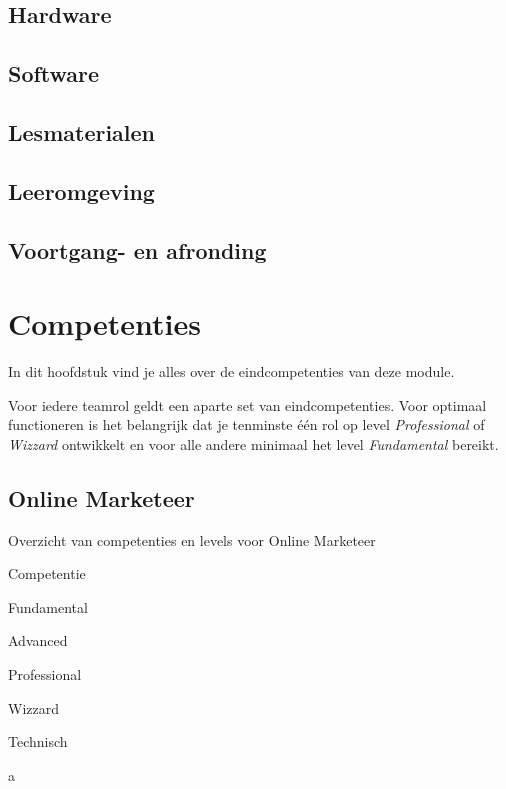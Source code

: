 \documentclass[]{book}
\begin{document}
\section{Hardware}\label{hardware}

\section{Software}\label{software}

\section{Lesmaterialen}\label{lesmaterialen}

\section{Leeromgeving}\label{leeromgeving}

\section{Voortgang- en afronding}\label{voortgang--en-afronding}

\chapter{Competenties}\label{competenties}

In dit hoofdstuk vind je alles over de eindcompetenties van deze module.

Voor iedere teamrol geldt een aparte set van eindcompetenties. Voor
optimaal functioneren is het belangrijk dat je tenminste één rol op
level \emph{Professional} of \emph{Wizzard} ontwikkelt en voor alle
andere minimaal het level \emph{Fundamental} bereikt.

\section{Online Marketeer}\label{online-marketeer}

\label{tab:unnamed-chunk-3}Overzicht van competenties en levels voor Online
Marketeer

Competentie

Fundamental

Advanced

Professional

Wizzard

Technisch

a
\end{document}

